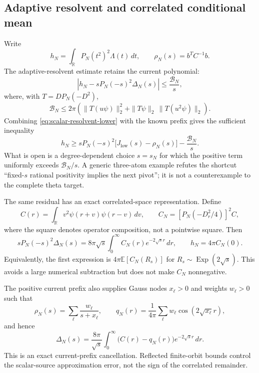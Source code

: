 \documentclass[11pt]{article}
\theoremstyle{definition}
\theoremstyle{remark}
\newcommand{\R}{\mathbb{R}}
\newcommand{\E}{\mathbb{E}}
\begin{document}
\subsection{Adaptive resolvent and correlated conditional mean}

Write
\begin{equation}
 h_N=\int_{\R}P_N(t^2)^2\Lambda(t)\,dt,
 \qquad \rho_N(s)=b^TC^{-1}b.
\end{equation}
The adaptive-resolvent estimate retains the current polynomial:
\begin{equation}
 \left|h_N-sP_N(-s)^2\Delta_N(s)\right|
 \le\frac{\mathcal B_N}{s},
 \label{eq:adaptive-resolvent-error}
\end{equation}
where, with $T=DP_N(-D^2)$,
\begin{equation}
 \mathcal B_N\le2\pi\left(
 \|T(u\psi)\|_2^2+\|T\psi\|_2\,\|T(u^2\psi)\|_2
 \right).
 \label{eq:adaptive-envelope}
\end{equation}
Combining \eqref{eq:scalar-resolvent-lower} with the known prefix gives the
sufficient inequality
\begin{equation}
 h_N\ge sP_N(-s)^2\bigl[J_{\mathrm{low}}(s)-\rho_N(s)\bigr]
       -\frac{\mathcal B_N}{s}.
 \label{eq:adaptive-lower}
\end{equation}
What is open is a degree-dependent choice $s=s_N$ for which the positive term
uniformly exceeds $\mathcal B_N/s$. A generic three-atom example refutes the
shortcut ``fixed-$s$ rational positivity implies the next pivot''; it is not a
counterexample to the complete theta target.

The same residual has an exact correlated-space representation. Define
\begin{equation}
 C(r)=\int_{\R}v^2\psi(r+v)\psi(r-v)\,dv,
 \qquad
 C_N=[P_N(-D_r^2/4)]^2C,
 \label{eq:correlated-kernel}
\end{equation}
where the square denotes operator composition, not a pointwise square. Then
\begin{equation}
 sP_N(-s)^2\Delta_N(s)
 =8\pi\sqrt{s}\int_0^\infty C_N(r)e^{-2\sqrt{s}r}\,dr,
 \qquad h_N=4\pi C_N(0).
 \label{eq:correlated-mean}
\end{equation}
Equivalently, the first expression is $4\pi\E[C_N(R_s)]$ for
$R_s\sim\operatorname{Exp}(2\sqrt{s})$. This avoids a large numerical
subtraction but does not make $C_N$ nonnegative.

The positive current prefix also supplies Gauss nodes $x_\ell>0$ and weights
$w_\ell>0$ such that
\begin{equation}
 \rho_N(s)=\sum_\ell\frac{w_\ell}{s+x_\ell},
 \qquad
 q_N(r)=\frac1{4\pi}\sum_\ell w_\ell
                 \cos(2\sqrt{x_\ell}r),
\end{equation}
and hence
\begin{equation}
 \Delta_N(s)=\frac{8\pi}{\sqrt{s}}
 \int_0^\infty\bigl(C(r)-q_N(r)\bigr)e^{-2\sqrt{s}r}\,dr.
 \label{eq:gauss-source}
\end{equation}
This is an exact current-prefix cancellation. Reflected finite-orbit bounds
control the scalar-source approximation error, not the sign of the correlated
remainder.
\end{document}
